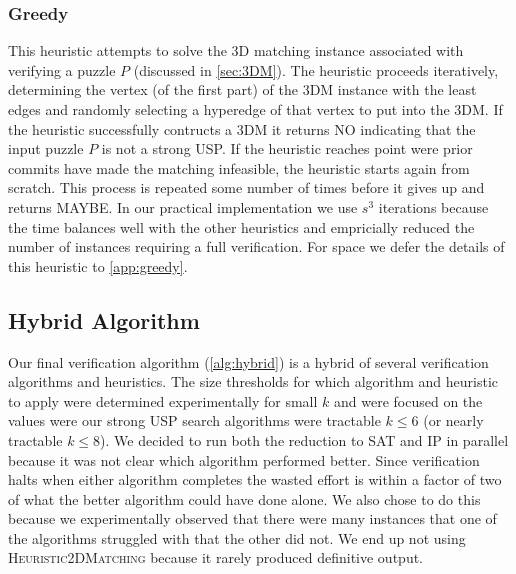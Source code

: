 \documentclass[11pt]{article}
\begin{document}
\subsubsection{Greedy}

This heuristic attempts to solve the 3D matching instance associated
with verifying a puzzle $P$ (discussed in \autoref{sec:3DM}).  The
heuristic proceeds iteratively, determining the vertex (of the first
part) of the 3DM instance with the least edges and randomly selecting
a hyperedge of that vertex to put into the 3DM.  If the heuristic
successfully contructs a 3DM it returns NO indicating that the input
puzzle $P$ is not a strong USP.  If the heuristic reaches point were
prior commits have made the matching infeasible, the heuristic starts
again from scratch.  This process is repeated some number of times
before it gives up and returns MAYBE.  In our practical implementation
we use $s^3$ iterations because the time balances well with the other
heuristics and empricially reduced the number of instances requiring a
full verification.  For space we defer the details of this heuristic
to \autoref{app:greedy}.








\subsection{Hybrid Algorithm}

Our final verification algorithm (\autoref{alg:hybrid}) is a hybrid of
several verification algorithms and heuristics.  The size thresholds
for which algorithm and heuristic to apply were determined
experimentally for small $k$ and were focused on the values were our
strong USP search algorithms were tractable $k \le 6$ (or nearly
tractable $k \le 8$).  We decided to run both the reduction to SAT and
IP in parallel because it was not clear which algorithm performed
better.  Since verification halts when either algorithm completes the
wasted effort is within a factor of two of what the better algorithm
could have done alone.  We also chose to do this because we
experimentally observed that there were many instances that one of the
algorithms struggled with that the other did not.  We end up not using
\textsc{Heuristic2DMatching} because it rarely produced definitive
output.
\end{document}
